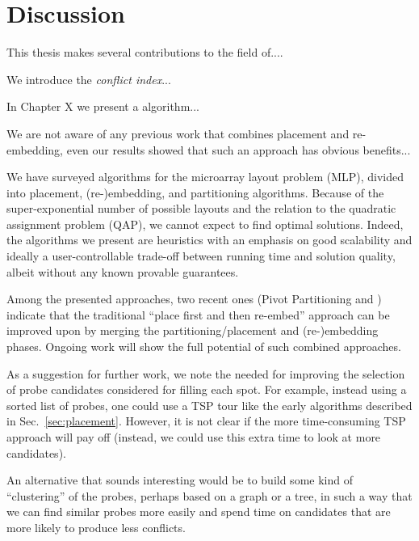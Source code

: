 \chapter{Discussion}
\label{ch:discussion}

This thesis makes several contributions to the field of....

We introduce the \emph{conflict index}...

In Chapter X we present a algorithm...

We are not aware of any previous work that combines placement and
re-embedding, even our results showed that such an approach has
obvious benefits...

We have surveyed algorithms for the microarray layout problem (MLP), divided
into placement, (re-)embedding, and partitioning algorithms.  Because of the
super-exponential number of possible layouts and the relation to the quadratic
assignment problem (QAP), we cannot expect to find optimal solutions. Indeed,
the algorithms we present are heuristics with an emphasis on good scalability
and ideally a user-controllable trade-off between running time and solution
quality, albeit without any known provable guarantees.

Among the presented approaches, two recent ones (Pivot Partitioning and
\Greedyplus) indicate that the traditional ``place first and then re-embed''
approach can be improved upon by merging the partitioning/placement and
(re-)embedding phases. Ongoing work will show the full potential of such
combined approaches.

As a suggestion for further work, we note the needed for improving
the selection of probe candidates considered for filling each spot. For
example, instead using a sorted list of probes, one could use a TSP tour
like the early algorithms described in Sec.~\ref{sec:placement}. However,
it is not clear if the more time-consuming TSP approach will pay off
(instead, we could use this extra time to look at more candidates).

An alternative that sounds interesting would be to build some kind of
``clustering'' of the probes, perhaps based on a graph or a tree, in such a
way that we can find similar probes more easily and spend time on candidates
that are more likely to produce less conflicts.